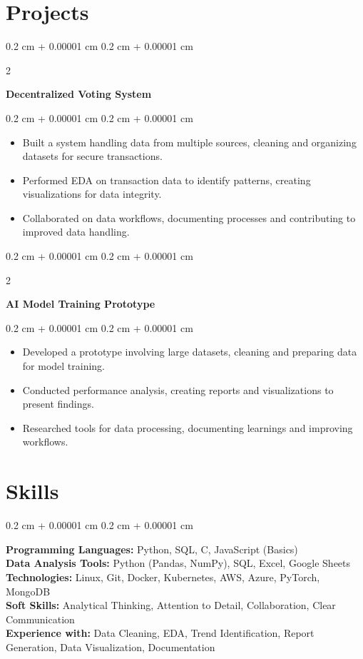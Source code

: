 \documentclass[10pt, letterpaper]{article}
\newenvironment{highlights}{
    \begin{itemize}[
        topsep=0.10 cm,
        parsep=0.10 cm,
        partopsep=0pt,
        itemsep=0pt,
        leftmargin=0.4 cm + 10pt
    ]
}{
    \end{itemize}
} %
\newenvironment{onecolentry}{
    \begin{adjustwidth}{
        0.2 cm + 0.00001 cm
    }{
        0.2 cm + 0.00001 cm
    }
}{
    \end{adjustwidth}
} %
\newenvironment{twocolentry}[2][]{
    \onecolentry
    \def\secondColumn{#2}
    \setcolumnwidth{\fill, 4.5 cm}
    \begin{paracol}{2}
}{
    \switchcolumn \raggedleft \secondColumn
    \end{paracol}
    \endonecolentry
} %
\let\hrefWithoutArrow\href
\renewcommand{\href}[2]{\hrefWithoutArrow{#1}{\ifthenelse{\equal{#2}{}}{ }{#2 }\raisebox{.15ex}{\footnotesize \faExternalLink*}}}
\begin{document}
    \section{Projects}
    \begin{twocolentry}{}
        \textbf{Decentralized Voting System} \href{https://github.com/deadhearth01/decentralized-voting-system-R307S}{\faGithub}
    \end{twocolentry}
    \vspace{0.10 cm}
    \begin{onecolentry}
        \begin{highlights}
            \item Built a system handling data from multiple sources, cleaning and organizing datasets for secure transactions.
            \item Performed EDA on transaction data to identify patterns, creating visualizations for data integrity.
            \item Collaborated on data workflows, documenting processes and contributing to improved data handling.
        \end{highlights}
    \end{onecolentry}
    \vspace{0.10 cm}
    \begin{twocolentry}{}
        \textbf{AI Model Training Prototype} \href{https://github.com/deadhearth01/ai-model-prototype}{\faGithub}
    \end{twocolentry}
    \vspace{0.10 cm}
    \begin{onecolentry}
        \begin{highlights}
            \item Developed a prototype involving large datasets, cleaning and preparing data for model training.
            \item Conducted performance analysis, creating reports and visualizations to present findings.
            \item Researched tools for data processing, documenting learnings and improving workflows.
        \end{highlights}
    \end{onecolentry}
    \section{Skills}
    \begin{onecolentry}
        \textbf{Programming Languages:} Python, SQL, C, JavaScript (Basics) \\
        \textbf{Data Analysis Tools:} Python (Pandas, NumPy), SQL, Excel, Google Sheets \\
        \textbf{Technologies:} Linux, Git, Docker, Kubernetes, AWS, Azure, PyTorch, MongoDB \\
        \textbf{Soft Skills:} Analytical Thinking, Attention to Detail, Collaboration, Clear Communication \\
        \textbf{Experience with:} Data Cleaning, EDA, Trend Identification, Report Generation, Data Visualization, Documentation
    \end{onecolentry}
\end{document}
